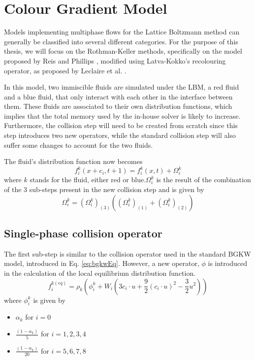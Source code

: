 \documentclass[12pt, openany]{book}
\begin{document}
\section{Colour Gradient Model}\label{sec:cgModel}
Models implementing multiphase flows for the Lattice Boltzmann method can generally be classified into several different categories. For the purpose of this thesis, we will focus on the Rothman-Keller methods, specifically on the model proposed by Reis and Phillips \cite{reisPhil}, modified using Latva-Kokko's recolouring operator, as proposed by Leclaire et al. \cite{leclaire3}. \par
In this model, two immiscible fluids are simulated under the LBM, a red fluid and a blue fluid, that only interact with each other in the interface between them. These fluids are associated to their own distribution functions, which implies that the total memory used by the in-house solver is likely to increase. Furthermore, the collision step will need to be created from scratch since this step introduces two new operators, while the standard collision step will also suffer some changes to account for the two fluids. \par
The fluid's distribution function now becomes
\begin{equation}\label{eq:cgDistrib}
f_{i}^{k}\left(x+c_i, t+1\right) = f_{i}^{k}\left(x,t\right) + \Omega_i^{k}
\end{equation}
where $k$ stands for the fluid, either red or blue.$\Omega_i^{k}$ is the result of the combination of the 3 sub-steps present in the new collision step and is given by
\begin{equation}\label{eq:cgColl}
\Omega_i^{k} = \left(\Omega_i^{k}\right)_{\left(3\right)} \left(\left(\Omega_i^{k}\right)_{\left(1\right)} + \left(\Omega_i^{k}\right)_{\left(2\right)}\right)
\end{equation}
\subsection{Single-phase collision operator}
The first sub-step is similar to the collision operator used in the standard BGKW model, introduced in Eq. \ref{eq:bgkwEq}. However, a new operator, $\phi$ is introduced in the calculation of the local equilibrium distribution function. 
\begin{equation}\label{eq:newFEQ}
f_i^{k\left(eq\right)} = \rho_k\left(\phi_i^k + W_i\left(3c_i \cdot u + \frac{9}{2}\left(c_i \cdot u\right)^2 - \frac{3}{2}u^2 \right)\right)
\end{equation}
where $\phi_i^k$ is given by 
\begin{itemize}
	\item $\alpha_k$ for $i = 0$
	\item $\frac{\left(1-\alpha_k\right)}{5}$ for $i = {1,2,3,4}$
	\item $\frac{\left(1-\alpha_k\right)}{20}$ for $i = {5,6,7,8}$
\end{itemize}
\end{document}
